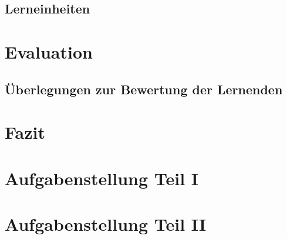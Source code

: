 \documentclass[a4paper, 12pt]{article}
\begin{document}
    \subsection{Lerneinheiten}
    \label{sec:learning-unit-meta}
    
    \pagebreak

    \section{Evaluation}
    
    \subsection{Überlegungen zur Bewertung der Lernenden}
    
    \pagebreak


    \section{Fazit}
    
    \pagebreak

    
    \pagebreak

    \appendix
    \section{Aufgabenstellung Teil I}
    \label{sec:learning-unit-1}
    

    \section{Aufgabenstellung Teil II}
    \label{sec:learning-unit-2}
    

\end{document}
